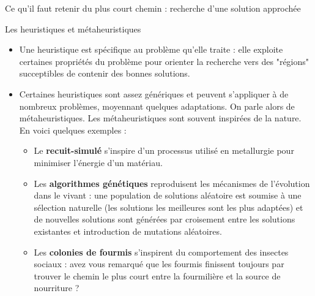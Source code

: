 \begin{frame}{Ce qu'il faut retenir du plus court chemin : recherche d'une solution approchée}
\begin{block}{Les heuristiques et métaheuristiques}
    \begin{itemize}
      \item Une heuristique est spécifique au problème qu'elle traite : elle exploite certaines propriétés du problème pour orienter la recherche vers des "régions" succeptibles de contenir des bonnes solutions.
      \item Certaines heuristiques sont assez génériques et peuvent s'appliquer à de nombreux problèmes, moyennant quelques adaptations. On parle alors de \alert{métaheuristiques}. Les métaheuristiques sont souvent inspirées de la nature. En voici quelques exemples : 
        \begin{itemize}
          \item Le \textbf{recuit-simulé} s'inspire d'un processus utilisé en metallurgie pour minimiser l'énergie d'un matériau.
          \item Les \textbf{algorithmes génétiques} reproduisent les mécanismes de l'évolution dans le vivant : une population de solutions aléatoire est soumise à une sélection naturelle (les solutions les meilleures sont les plus adaptées) et de nouvelles solutions sont générées par croisement entre les solutions existantes et introduction de mutations aléatoires.
          \item Les \textbf{colonies de fourmis} s'inspirent du comportement des insectes sociaux : avez vous remarqué que les fourmis finissent toujours par trouver le chemin le plus court entre la fourmilière et la source de nourriture ?
        \end{itemize}
    \end{itemize}
  \end{block}



\end{frame}
